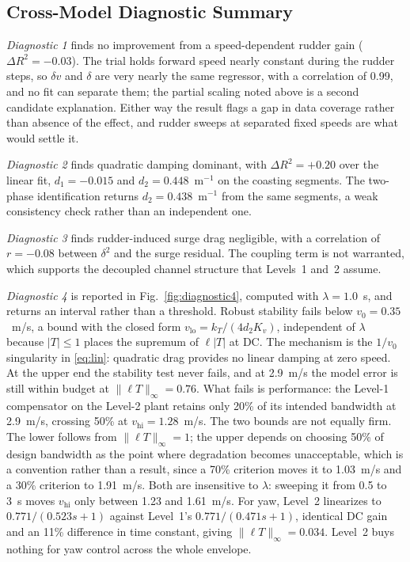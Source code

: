 \documentclass[conference]{IEEEtran}
\begin{document}
\subsection{Cross-Model Diagnostic Summary}
\label{sec:diag-results}

\emph{Diagnostic 1} finds no improvement from a speed-dependent rudder gain ($\Delta R^2 = -0.03$). The trial holds forward speed nearly constant during the rudder steps, so $\delta v$ and $\delta$ are very nearly the same regressor, with a correlation of 0.99, and no fit can separate them; the partial scaling noted above is a second candidate explanation. Either way the result flags a gap in data coverage rather than absence of the effect, and rudder sweeps at separated fixed speeds are what would settle it.

\emph{Diagnostic 2} finds quadratic damping dominant, with $\Delta R^2=+0.20$ over the linear fit, $d_1=-0.015$ and $d_2=0.448$~m$^{-1}$ on the coasting segments. The two-phase identification returns $d_2=0.438$~m$^{-1}$ from the same segments, a weak consistency check rather than an independent one.

\emph{Diagnostic 3} finds rudder-induced surge drag negligible, with a correlation of $r=-0.08$ between $\delta^2$ and the surge residual. The coupling term is not warranted, which supports the decoupled channel structure that Levels~1 and~2 assume.

\emph{Diagnostic 4} is reported in Fig.~\ref{fig:diagnostic4}, computed with $\lambda=1.0$~s, and returns an interval rather than a threshold. Robust stability fails below $v_0=0.35$~m/s, a bound with the closed form $v_{\text{lo}}=k_T/(4d_2K_v)$, independent of $\lambda$ because $|T|\leq1$ places the supremum of $\ell|T|$ at DC. The mechanism is the $1/v_0$ singularity in \eqref{eq:lin}: quadratic drag provides no linear damping at zero speed. At the upper end the stability test never fails, and at 2.9~m/s the model error is still within budget at $\|\ell T\|_\infty=0.76$. What fails is performance: the Level-1 compensator on the Level-2 plant retains only 20\% of its intended bandwidth at 2.9~m/s, crossing 50\% at $v_{\text{hi}}=1.28$~m/s. The two bounds are not equally firm. The lower follows from $\|\ell T\|_\infty=1$; the upper depends on choosing 50\% of design bandwidth as the point where degradation becomes unacceptable, which is a convention rather than a result, since a 70\% criterion moves it to 1.03~m/s and a 30\% criterion to 1.91~m/s. Both are insensitive to $\lambda$: sweeping it from 0.5 to 3~s moves $v_{\text{hi}}$ only between 1.23 and 1.61~m/s. For yaw, Level~2 linearizes to $0.771/(0.523s+1)$ against Level~1's $0.771/(0.471s+1)$, identical DC gain and an 11\% difference in time constant, giving $\|\ell T\|_\infty=0.034$. Level~2 buys nothing for yaw control across the whole envelope.
\end{document}
